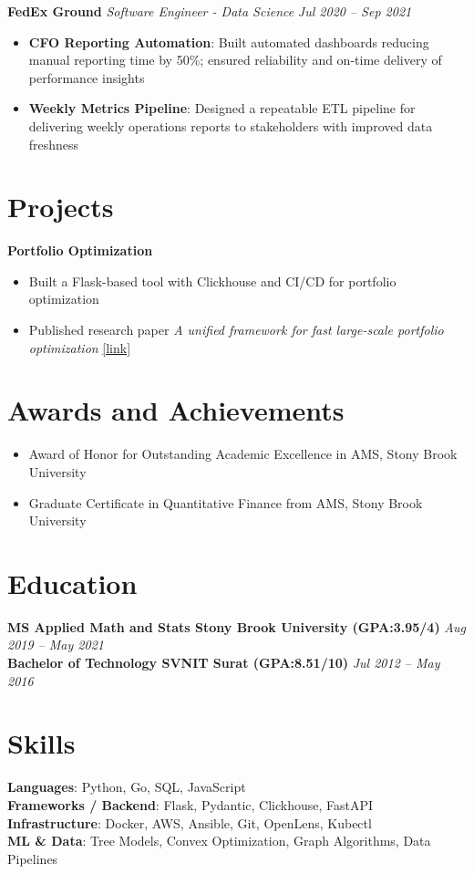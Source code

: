 \documentclass[letterpaper,10pt]{article}
\begin{document}
\textbf{{FedEx Ground}} \textit{{Software Engineer - Data Science}} \hfill \textit{{Jul 2020 -- Sep 2021}}
\begin{itemize}
    \item \textbf{{CFO Reporting Automation}}: Built automated dashboards reducing manual reporting time by 50\%; ensured reliability and on-time delivery of performance insights
    \item \textbf{{Weekly Metrics Pipeline}}: Designed a repeatable ETL pipeline for delivering weekly operations reports to stakeholders with improved data freshness
\end{itemize}
\section*{Projects}
\textbf{{Portfolio Optimization}}
\begin{itemize}
    \item Built a Flask-based tool with Clickhouse and CI/CD for portfolio optimization
    \item Published research paper \textit{{A unified framework for fast large-scale portfolio optimization}} \href{{https://arxiv.org/abs/2303.12751}}{{[link]}}
\end{itemize}
\section*{ Awards and Achievements}
\begin{itemize}
    \item Award of Honor for Outstanding Academic Excellence in AMS, Stony Brook University
    \item Graduate Certificate in Quantitative Finance from AMS, Stony Brook University
\end{itemize}
\section*{Education}
\textbf{{MS Applied Math and Stats Stony Brook University (GPA:3.95/4)}} \hfill \textit{{Aug 2019 -- May 2021}} \\
\textbf{{Bachelor of Technology SVNIT Surat (GPA:8.51/10)}} \hfill \textit{{Jul 2012 -- May 2016}} 
\section*{Skills}
\textbf{{Languages}}: Python, Go, SQL, JavaScript\\
\textbf{{Frameworks / Backend}}: Flask, Pydantic, Clickhouse, FastAPI\\
\textbf{{Infrastructure}}: Docker, AWS, Ansible, Git, OpenLens, Kubectl\\
\textbf{{ML \& Data}}: Tree Models, Convex Optimization, Graph Algorithms, Data Pipelines
\end{document}
